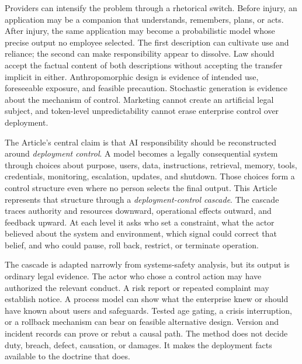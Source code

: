 Providers can intensify the problem through a rhetorical switch. Before injury, an application may be a companion that understands, remembers, plans, or acts. After injury, the same application may become a probabilistic model whose precise output no employee selected. The first description can cultivate use and reliance; the second can make responsibility appear to dissolve. Law should accept the factual content of both descriptions without accepting the transfer implicit in either. Anthropomorphic design is evidence of intended use, foreseeable exposure, and feasible precaution. Stochastic generation is evidence about the mechanism of control. Marketing cannot create an artificial legal subject, and token-level unpredictability cannot erase enterprise control over deployment.

The Article's central claim is that AI responsibility should be reconstructed around \emph{deployment control}. A model becomes a legally consequential system through choices about purpose, users, data, instructions, retrieval, memory, tools, credentials, monitoring, escalation, updates, and shutdown. Those choices form a control structure even where no person selects the final output. This Article represents that structure through a \emph{deployment-control cascade}. The cascade traces authority and resources downward, operational effects outward, and feedback upward. At each level it asks who set a constraint, what the actor believed about the system and environment, which signal could correct that belief, and who could pause, roll back, restrict, or terminate operation.

The cascade is adapted narrowly from systems-safety analysis, but its output is ordinary legal evidence. The actor who chose a control action may have authorized the relevant conduct. A risk report or repeated complaint may establish notice. A process model can show what the enterprise knew or should have known about users and safeguards. Tested age gating, a crisis interruption, or a rollback mechanism can bear on feasible alternative design. Version and incident records can prove or rebut a causal path. The method does not decide duty, breach, defect, causation, or damages. It makes the deployment facts available to the doctrine that does.

